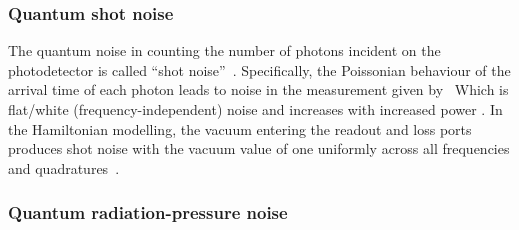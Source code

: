 \subsubsection{Quantum shot noise}

The quantum noise in counting the number of photons incident on the photodetector is called ``shot noise''~\cite{}. 
Specifically, the Poissonian behaviour of the arrival time of each photon leads to noise in the measurement given by~\cite{}  
Which is flat/white (frequency-independent) noise and increases with increased power .
In the Hamiltonian modelling, the vacuum entering the readout and loss ports produces shot noise with the vacuum value of one uniformly across all frequencies and quadratures~\cite{}. 

\subsubsection{Quantum radiation-pressure noise}


